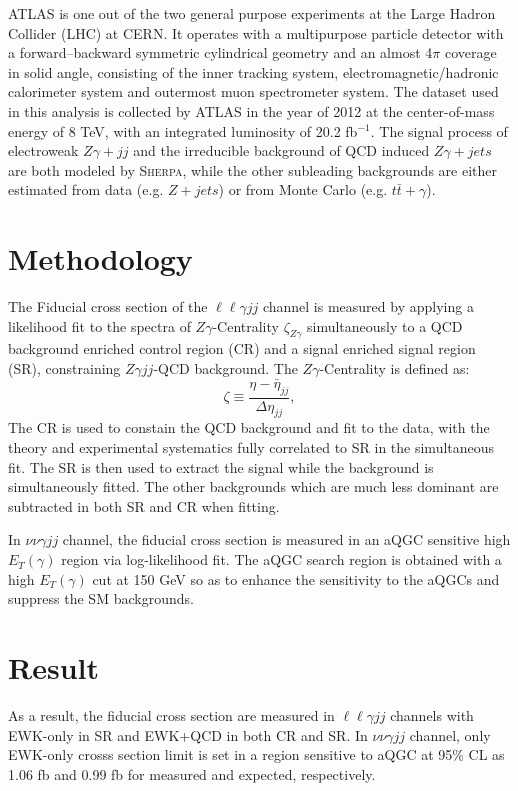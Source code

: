 \documentclass[10pt]{article}
\begin{document}
ATLAS is one out of the two general purpose experiments at the Large Hadron Collider (LHC) at CERN. It operates with a multipurpose particle detector with a forward–backward
symmetric cylindrical geometry and an almost 4$\pi$ coverage in solid angle, consisting of the inner tracking system, electromagnetic/hadronic calorimeter system and outermost
muon spectrometer system. The dataset used in this analysis is collected by ATLAS in the year of 2012 at the center-of-mass energy of 8 TeV, with an integrated luminosity of 20.2 fb$^{-1}$.
The signal process of electroweak $Z\gamma+jj$ and the irreducible background of QCD induced $Z\gamma+jets$ are both modeled by \textsc{Sherpa}, while the other subleading backgrounds are either
estimated from data (e.g. $Z+jets$) or from Monte Carlo (e.g. $t\bar{t}+\gamma$).

\section{Methodology}

The Fiducial cross section of the $\ell \ell \gamma jj$ channel is measured by
applying a likelihood fit to the spectra of $Z\gamma$-Centrality $\zeta_{Z\gamma}$
simultaneously to a QCD background enriched control region (CR) and a signal enriched signal region (SR),
constraining $Z\gamma jj$-QCD background.
The $Z\gamma$-Centrality is defined as:
\begin{equation}
\label{eqn:centrality}
 \zeta  \equiv \frac{\eta - \bar{\eta}_{jj}}{\Delta \eta_{jj}},
\end{equation}
The CR is used to constain the QCD background and fit to the data, with the theory and experimental systematics fully correlated to SR in the simultaneous fit.
The SR is then used to extract the signal while the background is simultaneously fitted. The other backgrounds which are much less dominant are subtracted in both SR and CR when fitting.


In $\nu \nu \gamma jj$ channel, the fiducial cross section is measured in an aQGC sensitive high $E_T(\gamma)$ region via log-likelihood fit.
The aQGC search region is obtained with a high $E_T(\gamma)$ cut at 150 GeV so as to enhance the sensitivity to the aQGCs and suppress the SM backgrounds.

\section{Result}

As a result, the fiducial cross section are measured in $\ell \ell \gamma jj$ channels with EWK-only in SR and EWK+QCD in both CR and SR. In $\nu \nu \gamma jj$ channel, only EWK-only
crosss section limit is set in a region sensitive to aQGC at 95\% CL as 1.06 fb and 0.99 fb for measured and expected, respectively.
\end{document}
